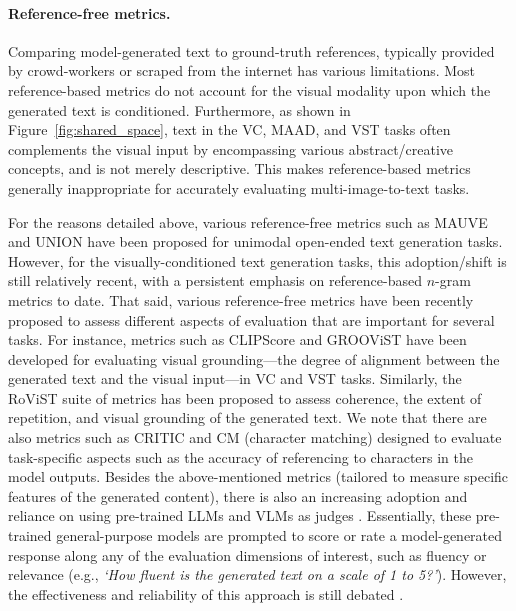 \paragraph{Reference-free metrics.}
Comparing model-generated text to ground-truth references, typically provided by crowd-workers or scraped from the internet has various limitations. Most reference-based metrics do not account for the visual modality upon which the generated text is conditioned. Furthermore, as shown in Figure~\ref{fig:shared_space}, text in the \color{xkcdVividBlue}VC\color{black}, \color{xkcdVividBlue}MAAD\color{black}, and \color{xkcdVividBlue}VST \color{black} tasks often complements the visual input by encompassing various abstract/creative concepts, and is not merely descriptive. This makes reference-based metrics generally inappropriate for accurately evaluating multi-image-to-text tasks.

For the reasons detailed above, various reference-free metrics such as MAUVE \cite{mauve} and UNION \cite{union} have been proposed for unimodal open-ended text generation tasks. However, for the visually-conditioned text generation tasks, this adoption/shift is still relatively recent, with a persistent emphasis on reference-based $\mathit{n}$-gram metrics to date. That said, various reference-free metrics have been recently proposed to assess different aspects of evaluation that are important for several tasks. For instance, metrics such as CLIPScore \cite{clipscore} and GROOViST \cite{groovist} have been developed for evaluating visual grounding---the degree of alignment between the generated text and the visual input---in \color{xkcdVividBlue}VC \color{black} and \color{xkcdVividBlue}VST \color{black} tasks. Similarly, the RoViST \cite{rovist} suite of metrics has been proposed to assess coherence, the extent of repetition, and visual grounding of the generated text. We note that there are also metrics such as CRITIC \cite{maad3} and CM (character matching) \cite{vist_cm} designed to evaluate task-specific aspects such as the accuracy of referencing to characters in the model outputs. Besides the above-mentioned metrics (tailored to measure specific features of the generated content), there is also an increasing adoption and reliance on using pre-trained LLMs and VLMs as judges \cite{llmeval2}. Essentially, these pre-trained general-purpose models are prompted to score or rate a model-generated response along any of the evaluation dimensions of interest, such as fluency or relevance (e.g.,\textit{ `How fluent is the generated text on a scale of 1 to 5?'}). However, the effectiveness and reliability of this approach is still debated \cite{llmeval1}.

